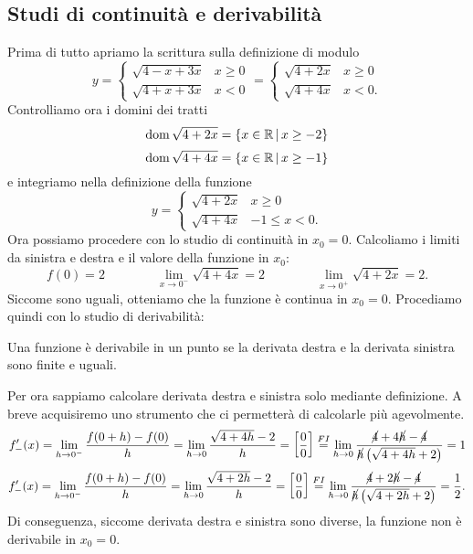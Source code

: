 \documentclass{book}     %
\begin{document}
\subsection{Studi di continuità e derivabilità}
\begin{ex}
    [Studiare continuità e derivabilità della funzione $y=\sqrt{4-|x|+3x}$ in $x_0=0$]
    Prima di tutto apriamo la scrittura sulla definizione di modulo
    \[y=\begin{cases}
        \sqrt{4-x+3x} & x\geq 0\\
        \sqrt{4+x+3x} & x < 0
    \end{cases} = \begin{cases}
        \sqrt{4+2x} & x\geq 0\\
        \sqrt{4+4x} & x < 0.
    \end{cases}\]
    Controlliamo ora i domini dei tratti
    \[\operatorname{dom}\sqrt{4+2x}=\{x\in \mathbb{R}\, |\, x\geq -2\}\]
    \[\operatorname{dom}\sqrt{4+4x}=\{x\in \mathbb{R}\, |\, x\geq -1\}\]
    e integriamo nella definizione della funzione
    \[y=\begin{cases}
        \sqrt{4+2x} & x\geq 0\\
        \sqrt{4+4x} & -1 \leq x < 0.
    \end{cases}\]
    Ora possiamo procedere con lo studio di continuità in $x_0=0$. Calcoliamo i limiti da sinistra e destra e il valore della funzione in $x_0$:
    \[
        f(0)=2 \qquad\qquad
        \lim_{x\to 0^-}\sqrt{4+4x}=2\qquad \qquad
        \lim_{x\to 0^+}\sqrt{4+2x}=2.
    \]
    Siccome sono uguali, otteniamo che la funzione è continua in $x_0=0$. Procediamo quindi con lo studio di derivabilità:
    \begin{ricorda}
        Una funzione è derivabile in un punto se la derivata destra e la derivata sinistra sono finite e uguali.
    \end{ricorda}
    Per ora sappiamo calcolare derivata destra e sinistra solo mediante definizione. A breve acquisiremo uno strumento che ci permetterà di calcolarle più agevolmente.
    \[f'_-(x)=\lim_{h\to0^-}\frac{f(0+h)-f(0)}{h}=\lim_{h\to0}\frac{\sqrt{4+4h}-2}{h}=\left[ \frac{0}{0} \right]\overset{FI}{=}\lim_{h\to0}\frac{\cancel{4}+4\cancel{h}-\cancel{4}}{\cancel{h}\left( \sqrt{4+4h}+2 \right)}=1\]
    \[f'_-(x)=\lim_{h\to0^-}\frac{f(0+h)-f(0)}{h}=\lim_{h\to0}\frac{\sqrt{4+2h}-2}{h}=\left[ \frac{0}{0} \right]\overset{FI}{=}\lim_{h\to0}\frac{\cancel{4}+2\cancel{h}-\cancel{4}}{\cancel{h}\left( \sqrt{4+2h}+2 \right)}=\frac{1}{2}.\]
    Di conseguenza, siccome derivata destra e sinistra sono diverse, la funzione non è derivabile in $x_0=0$.
\end{ex}
\end{document}
